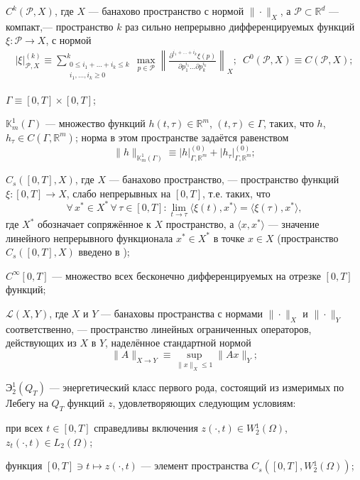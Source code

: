 \documentclass{report}
\begin{document}
$C^k(\mathcal{P},X)$, где  $X$ --- банахово пространство с нормой $\|\cdot\|_X$, а  $\mathcal{P}\subset \mathbb{R}^d$ --- компакт,--- пространство $k$ раз сильно непрерывно
дифференцируемых функций  $\xi:\mathcal{P}\to X$, с нормой
\begin{gather*}
\pmb{|}\xi\pmb{|}^{(k)}_{\mathcal{P},X}\equiv\sum\limits_{\substack{0\leqslant i_1+\dots+i_k\leqslant k\\
 i_1,\dots,i_k\geqslant0}}^k\max\limits_{p\in\mathcal{P}}\left\|
 \frac{\partial^{i_1+\dots+i_k}\xi(p)}{\partial p^{i_1}_1\dots\partial p^{i_k}_k}\right\|_X;\,\,\,C^0(\mathcal{P},X)\equiv C(\mathcal{P},X);
\end{gather*}

$\Gamma\equiv[0,T]\times[0,T]$;

$\mathbb{K}^1_m(\Gamma)$ --- множество функций $h(t,\tau)\in \mathbb{R}^m$, $(t,\tau)\in\Gamma$, таких, что $h$, $h_\tau\in C(\Gamma,\mathbb{R}^m)$; норма в этом пространстве задаётся
 равенством
$$
\|h\|_{\mathbb{K}^1_m(\Gamma)}\equiv\pmb{|}h\pmb{|}_{\Gamma,\mathbb{R}^m}^{(0)}+ \pmb{|}h_\tau\pmb{|}_{\Gamma,\mathbb{R}^m}^{(0)};
$$

$C_s([0,T],X)$, где $X$ --- банахово пространство, --- пространство функций $\xi\colon[0,T]\to X$, слабо непрерывных на $[0,T]$, т.е. таких, что
$$
\forall\,x^*\in X^*\,\forall\,\tau\in[0,T]:\lim\limits_{t\to\tau}\langle\xi(t),x^*\rangle=\langle\xi(\tau),x^*\rangle,
$$
где $X^*$ обозначает сопряжённое к $X$ пространство, а $\langle x,x^*\rangle$ --- значение линейного непрерывного функционала $x^*\in X^*$ в точке $x\in X$ (пространство $C_s([0,T],X)$
введено в \cite{LionsMajenes});

$C^\infty[0,T]$ --- множество всех бесконечно дифференцируемых на отрезке $[0,T]$ функций;

$\mathcal{L}(X,Y)$, где $X$ и $Y$ --- банаховы пространства с нормами $\|\cdot\|_X$ и $\|\cdot\|_Y$ соответственно, --- пространство
линейных ограниченных операторов, действующих из $X$ в $Y$, наделённое стандартной нормой
$$
\|A\|_{X\to Y}\equiv\sup\limits_{\|x\|_X\leqslant1}\|Ax\|_Y;
$$

$\textrm{Э}^{1}_{2}(Q_T)$ --- \glqq энергетический класс первого рода\grqq, состоящий из измеримых по Лебегу на $Q_T$ функций $z$, удовлетворяющих следующим условиям:

при всех $t\in[0,T]$ справедливы включения $z(\cdot,t)\in{W}\!^1_2(\Omega)$, $z_t(\cdot,t)\in L_2(\Omega)$;

функция $[0,T]\ni t\mapsto z(\cdot,t)$ --- элемент пространства $C_s([0,T],W\!^1_2(\Omega))$;
\end{document}
